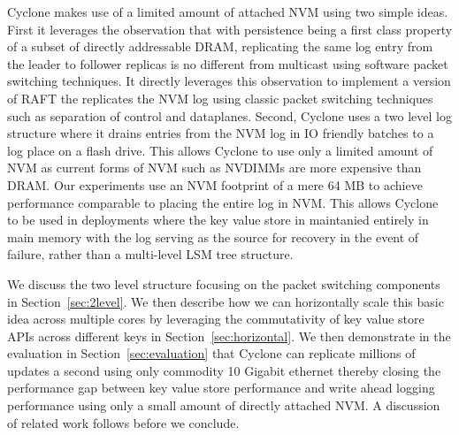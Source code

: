 \documentclass[10pt, preprint, nonatbib]{sigplanconf}
\begin{document}
Cyclone makes use of a limited amount of attached NVM using two simple
ideas. First it leverages the observation that with persistence being a first
class property of a subset of directly addressable DRAM, replicating the same
log entry from the leader to follower replicas is no different from multicast
using software packet switching techniques. It directly leverages this
observation to implement a version of RAFT the replicates the NVM log using
classic packet switching techniques such as separation of control and
dataplanes. Second, Cyclone uses a two level log structure where it drains
entries from the NVM log in IO friendly batches to a log place on a flash
drive. This allows Cyclone to use only a limited amount of NVM as current forms
of NVM such as NVDIMMs are more expensive than DRAM. Our experiments use an NVM
footprint of a mere 64 MB to achieve performance comparable to placing the
entire log in NVM. This allows Cyclone to be used in deployments where the key
value store in maintanied entirely in main memory with the log serving as the
source for recovery in the event of failure, rather than a multi-level LSM tree
structure.

We discuss the two level structure focusing on the packet switching components
in Section~\ref{sec:2level}. We then describe how we can horizontally scale this
basic idea across multiple cores by leveraging the commutativity of key value
store APIs across different keys in Section~\ref{sec:horizontal}. We then
demonstrate in the evaluation in Section~\ref{sec:evaluation} that Cyclone can
replicate millions of updates a second using only commodity 10 Gigabit ethernet
thereby closing the performance gap between key value store performance and
write ahead logging performance using only a small amount of directly attached
NVM. A discussion of related work follows before we conclude.
\end{document}
